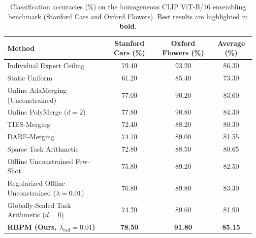 \begin{table}[ht]
\caption{Classification accuracies (\%) on the homogeneous CLIP ViT-B/16 ensembling benchmark (Stanford Cars and Oxford Flowers). Best results are highlighted in \textbf{bold}.}
\label{tab:vit_results}
\vskip 0.15in
\begin{center}
\begin{small}
\begin{sc}
\begin{tabular}{lccc}
\toprule
Method & Stanford Cars (\%) & Oxford Flowers (\%) & \textbf{Average (\%) } \\
\midrule
Individual Expert Ceiling & 79.40 & 93.20 & 86.30 \\
\midrule
Static Uniform & 61.20 & 85.40 & 73.30 \\
Online AdaMerging (Unconstrained) & 77.00 & 90.20 & 83.60 \\
Online PolyMerge ($d = 2$) & 77.80 & 90.80 & 84.30 \\
TIES-Merging & 72.40 & 88.20 & 80.30 \\
DARE-Merging & 74.10 & 89.00 & 81.55 \\
Sparse Task Arithmetic & 72.80 & 88.50 & 80.65 \\
Offline Unconstrained Few-Shot & 75.80 & 89.20 & 82.50 \\
Regularized Offline Unconstrained ($\lambda = 0.01$) & 76.80 & 89.80 & 83.30 \\
Globally-Scaled Task Arithmetic ($d=0$) & 74.20 & 89.60 & 81.90 \\
\textbf{RBPM (Ours, $\lambda_{\text{rad}} = 0.01$)} & \textbf{78.50} & \textbf{91.80} & \textbf{85.15} \\
\bottomrule
\end{tabular}
\end{sc}
\end{small}
\end{center}
\vskip -0.1in
\end{table}

